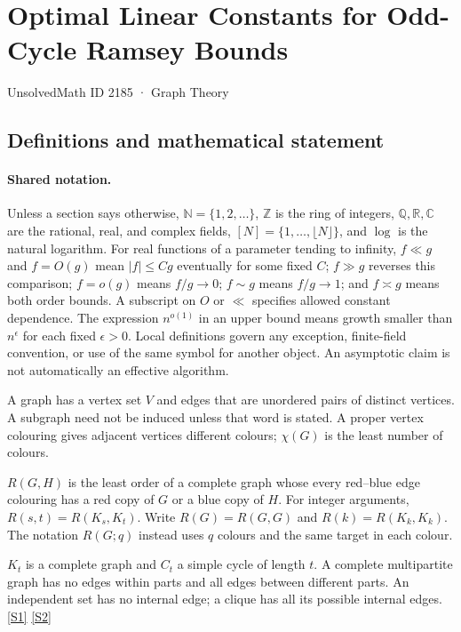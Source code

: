 \documentclass[11pt,a4paper]{article}
\newcommand{\N}{\mathbb{N}}
\newcommand{\Z}{\mathbb{Z}}
\newcommand{\Q}{\mathbb{Q}}
\newcommand{\R}{\mathbb{R}}
\newcommand{\C}{\mathbb{C}}
\newcommand{\sref}[2]{\hyperlink{source:#1:#2}{[S#2]}}
\begin{document}

\setcounter{section}{2184}

\section{Optimal Linear Constants for Odd-Cycle Ramsey Bounds}\label{2185}

{\small\sffamily UnsolvedMath ID 2185 · Graph Theory}

\subsection{Definitions and mathematical statement}

\paragraph{Shared notation.}Unless a section says otherwise, $\N=\{1,2,\ldots\}$,
$\Z$ is the ring of integers, $\Q,\R,\C$ are the rational, real, and complex
fields, $[N]=\{1,\ldots,\lfloor N\rfloor\}$, and $\log$ is the natural
logarithm. For real functions of a parameter tending to infinity,
$f\ll g$ and $f=O(g)$ mean $|f|\leq Cg$ eventually for some fixed $C$;
$f\gg g$ reverses this comparison; $f=o(g)$ means $f/g\to0$;
$f\sim g$ means $f/g\to1$; and $f\asymp g$ means both order bounds.
A subscript on $O$ or $\ll$ specifies allowed constant dependence.
The expression $n^{o(1)}$ in an upper bound means growth smaller than
$n^\epsilon$ for each fixed $\epsilon>0$. Local definitions govern any
exception, finite-field convention, or use of the same symbol for another
object. An asymptotic claim is not automatically an effective algorithm.



A graph has a vertex set $V$ and edges that are unordered pairs of distinct vertices. A subgraph need not be induced unless that word is stated. A proper vertex colouring gives adjacent vertices different colours; $\chi(G)$ is the least number of colours.

$R(G,H)$ is the least order of a complete graph whose every red--blue edge colouring has a red copy of $G$ or a blue copy of $H$. For integer arguments, $R(s,t)=R(K_s,K_t)$. Write $R(G)=R(G,G)$ and $R(k)=R(K_k,K_k)$. The notation $R(G;q)$ instead uses $q$ colours and the same target in each colour.

$K_t$ is a complete graph and $C_t$ a simple cycle of length $t$. A complete multipartite graph has no edges within parts and all edges between different parts. An independent set has no internal edge; a clique has all its possible internal edges. \sref{2185}{1} \sref{2185}{2}
\end{document}
